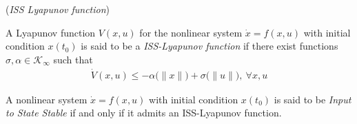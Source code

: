 \begin{bw_box}
\begin{definition}\cite{Sontag2008} (\textit{ISS Lyapunov function})

  A Lyapunov function $V(x,u)$ for the nonlinear system $\dot{x} = f(x,u)$
  with initial condition $x(t_0)$ is said to be a \textit{ISS-Lyapunov function}
  if there exist functions $\sigma, \alpha \in \mathcal{K}_{\infty}$ such that
  \begin{align}
    \dot{V}(x,u) \leq -\alpha\big(\|x\|\big) + \sigma\big(\|u\|\big),\ \forall x,u
  \end{align}
  \label{def:ISS_Lyapunov}
\end{definition}
\end{bw_box}

\begin{bw_box}
\begin{theorem}\cite{Sontag2008}

  A nonlinear system $\dot{x} = f(x,u)$ with initial condition $x(t_0)$ is said
  to be \textit{Input to State Stable} if and only if it admits an
  ISS-Lyapunov function.
  \label{def:ISS_Lyapunov_admit_theorem}
\end{theorem}
\end{bw_box}
